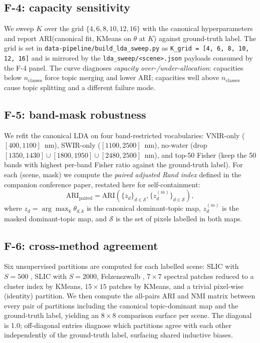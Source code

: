 \documentclass[journal,a4paper,10pt]{IEEEtran}
\begin{document}
\subsection{F-4: capacity sensitivity}

We sweep $K$ over the grid $\{4, 6, 8, 10, 12, 16\}$ with the
canonical hyperparameters and report ARI(canonical fit, KMeans on
$\theta$ at $K$) against ground-truth label. The grid is set in
\texttt{data-pipeline/build\_lda\_sweep.py} as \texttt{K\_grid =
[4, 6, 8, 10, 12, 16]} and is mirrored by the
\texttt{lda\_sweep/<scene>.json} payloads consumed by the F-4 panel. The curve diagnoses
\emph{capacity over-/under-allocation}: capacities below
$n_{\text{classes}}$ force topic merging and lower ARI; capacities
well above $n_{\text{classes}}$ cause topic splitting and a different
failure mode.

\subsection{F-5: band-mask robustness}

We refit the canonical LDA on four band-restricted vocabularies:
VNIR-only ($[400, 1100]$~nm), SWIR-only ($[1100, 2500]$~nm), no-water
(drop $[1350, 1430] \cup [1800, 1950] \cup [2480, 2500]$~nm), and
top-50 Fisher (keep the 50 bands with highest per-band Fisher ratio
against the ground-truth label). For each (scene, mask) we compute
the \emph{paired adjusted Rand index} defined in the companion
conference paper, restated here for self-containment:
\begin{equation}
\text{ARI}_{\text{paired}} = \text{ARI}\left(\{z_d\}_{d \in
\mathcal{S}}, \{z^{(m)}_d\}_{d \in \mathcal{S}}\right),
\label{eq:paired-ari}
\end{equation}
where $z_d = \arg\max_k \theta_{d,k}$ is the canonical dominant-topic
map, $z^{(m)}_d$ is the masked dominant-topic map, and $\mathcal{S}$
is the set of pixels labelled in both maps.

\subsection{F-6: cross-method agreement}

Six unsupervised partitions are computed for each labelled scene:
SLIC with $S = 500$ \cite{achanta2012slic}, SLIC with $S = 2000$,
Felzenszwalb \cite{felzenszwalb2004efficient}, $7\times7$ spectral
patches reduced to a cluster index by KMeans, $15\times15$ patches by
KMeans, and a trivial pixel-wise (identity) partition. We then compute
the all-pairs ARI and NMI matrix between every pair of partitions
including the canonical topic-dominant map and the ground-truth label,
yielding an $8 \times 8$ comparison surface per scene. The diagonal
is 1.0; off-diagonal entries diagnose which partitions agree with
each other independently of the ground-truth label, surfacing shared
inductive biases.
\end{document}
